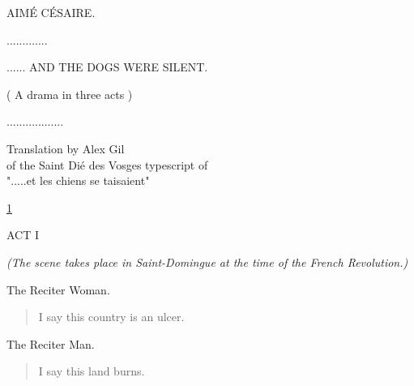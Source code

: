 \documentclass[letterpaper,article,12pt,oneside,notitlepage]{memoir}
\begin{document}
\thispagestyle{empty}

\clearpage

\begin{center}AIMÉ CÉSAIRE.\end{center}
\begin{center}.............\end{center}

\vspace{2cm}

\begin{center}...... AND THE DOGS WERE SILENT.\end{center}
\begin{center}( A drama in three acts )\end{center}
\begin{center}..................\end{center}

\vspace{7cm}

\begin{center}Translation by Alex Gil \\ of the Saint Dié des Vosges typescript of \\ ".....et les chiens se taisaient"\end{center}

\clearpage


\href{http://cesaire.elotroalex.com/chiens/chiens/p001.html}{1}

\begin{center}ACT I\end{center}
\vspace{1cm}

\textit{(The scene takes place in Saint-Domingue at the time of the French Revolution.)}

\begin{center}The Reciter Woman.\end{center}

\begin{verse}
I say this country is an ulcer. \\
\end{verse}

\begin{center}The Reciter Man.\end{center}

\begin{verse}
I say this land burns. \\
\end{verse}
\end{document}
